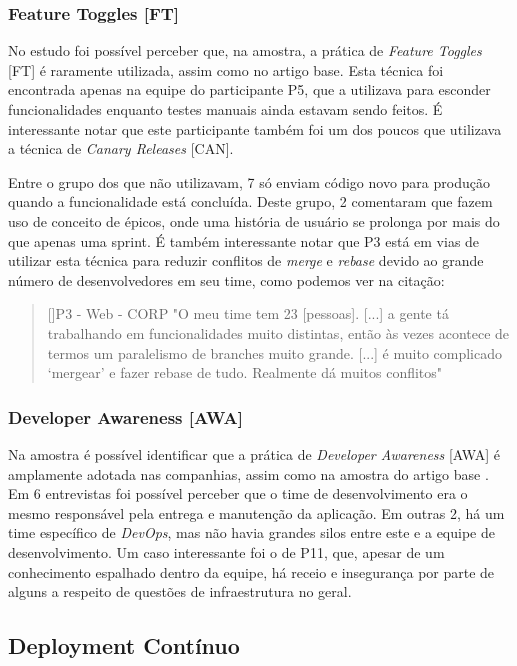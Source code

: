 \subsubsection{Feature Toggles [FT]}

No estudo foi possível perceber que, na amostra, a prática de \emph{Feature Toggles} [FT] é raramente utilizada, assim como no artigo base. Esta técnica foi encontrada apenas na equipe do participante P5, que a utilizava para esconder funcionalidades enquanto testes manuais ainda estavam sendo feitos. É interessante notar que este participante também foi um dos poucos que utilizava a técnica de \emph{Canary Releases} [CAN].

Entre o grupo dos que não utilizavam, 7 só enviam código novo para produção quando a funcionalidade está concluída. Deste grupo, 2 comentaram que fazem uso de conceito de épicos, onde uma história de usuário se prolonga por mais do que apenas uma sprint. É também interessante notar que P3 está em vias de utilizar esta técnica para reduzir conflitos de \emph{merge} e \emph{rebase} devido ao grande número de desenvolvedores em seu time, como podemos ver na citação:

\begin{quotation}[]{P3 - Web - CORP}
    "O meu time tem 23 [pessoas]. [...] a gente tá trabalhando em funcionalidades muito distintas, então às vezes acontece de termos um paralelismo de branches muito grande. [...] é muito complicado ‘mergear’ e fazer rebase de tudo. Realmente dá muitos conflitos"
\end{quotation}


\subsubsection{Developer Awareness [AWA]}

Na amostra é possível identificar que a prática de \emph{Developer Awareness} [AWA] é amplamente adotada nas companhias, assim como na amostra do artigo base . Em 6 entrevistas foi possível perceber que o time de desenvolvimento era o mesmo responsável pela entrega e manutenção da aplicação. Em outras 2, há um time específico de \emph{DevOps}, mas não havia grandes silos entre este e a equipe de desenvolvimento. Um caso interessante foi o de P11, que, apesar de um conhecimento espalhado dentro da equipe, há receio e insegurança por parte de alguns a respeito de questões de infraestrutura no geral.


\subsection{Deployment Contínuo}

